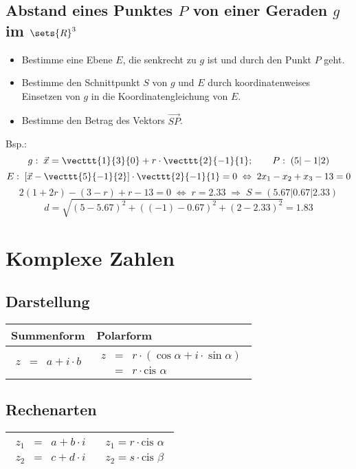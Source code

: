 \documentclass[a4paper]{article}
\begin{document}
\subsection{Abstand eines Punktes $P$ von einer Geraden $g$ im $\sets{R}^3$}
\begin{itemize}
\item Bestimme eine Ebene $E$, die senkrecht zu $g$ ist und durch den Punkt $P$ geht.
\item Bestimme den Schnittpunkt $S$ von $g$ und $E$ durch koordinatenweises Einsetzen von $g$ in die Koordinatengleichung von $E$.
\item Bestimme den Betrag des Vektors $\vec{SP}$.
\end{itemize}
Bsp.:
$$g: \; \vec{x} = \vecttt{1}{3}{0} + r \cdot \vecttt{2}{-1}{1}; \qquad P: \; (5|-1|2)$$
$$E: \; \left[ \vec{x} - \vecttt{5}{-1}{2} \right] \cdot \vecttt{2}{-1}{1} = 0 \;\Leftrightarrow\; 2x_1 - x_2 + x_3 -13 = 0$$
$$2(1+2r) - (3-r) + r-13 = 0  \;\Leftrightarrow\; r = 2.33 \; \Rightarrow \; S = \left( 5.67 | 0.67| 2.33 \right)$$
$$d = \sqrt{\left(5-5.67\right)^2 + \left( (-1) - 0.67 \right)^2 + \left(2-2.33 \right)^2} = 1.83$$

\section{Komplexe Zahlen}
\subsection{Darstellung}
\begin{center}
\begin{tabular}{|p{}  | p{}|}
\hline
Summenform & Polarform \\
\hline
\begin{eqnarray*}
z &=& a+i \cdot b
\end{eqnarray*} &
\begin{eqnarray*}
z &=& r \cdot ( \cos \alpha + i \cdot \sin \alpha) \\
  &=& r \cdot \text{cis } \alpha
\end{eqnarray*}\\
\hline
\end{tabular}
\end{center}

\renewcommand{\cis}{\text{cis }}
\subsection{Rechenarten}
\begin{tabular}{| p{} | p{} |}
\hline
\begin{eqnarray*}
z_1 &=& a + b \cdot i\\
z_2 &=& c + d \cdot i
\end{eqnarray*} &
\begin{eqnarray*}
z_1 = r \cdot \cis \alpha\\
z_2 = s \cdot \cis \beta
\end{eqnarray*}\\
\hline
\end{tabular}
\end{document}
